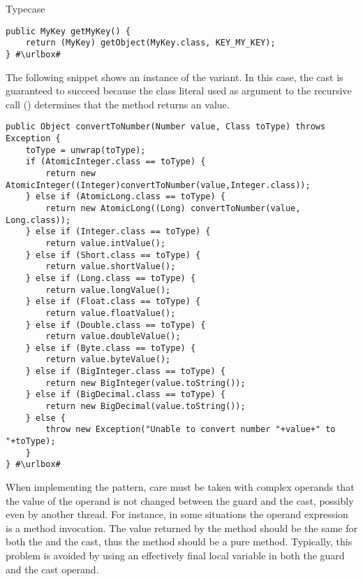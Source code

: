 \begin{pattern}{Typecase}
\def\urlvar{http://bit.ly/smartdevicelink_sdl_android_2EjJiaq}
\begin{verbatim}
public MyKey getMyKey() {
    return (MyKey) getObject(MyKey.class, KEY_MY_KEY);
} #\urlbox#
\end{verbatim}

The following snippet shows an instance of the  variant. 
In this case, the cast is guaranteed to succeed because the class literal used as argument to the recursive call () determines that the method returns an  value.
\def\urlvar{http://bit.ly/apache_karaf_2HE55gE}
\begin{verbatim}
public Object convertToNumber(Number value, Class toType) throws Exception {
    toType = unwrap(toType);
    if (AtomicInteger.class == toType) {
        return new AtomicInteger((Integer)convertToNumber(value,Integer.class));
    } else if (AtomicLong.class == toType) {
        return new AtomicLong((Long) convertToNumber(value, Long.class));
    } else if (Integer.class == toType) {
        return value.intValue();
    } else if (Short.class == toType) {
        return value.shortValue();
    } else if (Long.class == toType) {
        return value.longValue();
    } else if (Float.class == toType) {
        return value.floatValue();
    } else if (Double.class == toType) {
        return value.doubleValue();
    } else if (Byte.class == toType) {
        return value.byteValue();
    } else if (BigInteger.class == toType) {
        return new BigInteger(value.toString());
    } else if (BigDecimal.class == toType) {
        return new BigDecimal(value.toString());
    } else {
        throw new Exception("Unable to convert number "+value+" to "+toType);
    }
} #\urlbox#
\end{verbatim}


\detection{}
When implementing the pattern,
care must be taken with complex operands that the value of the operand is
not changed between the guard and the cast, possibly even by another thread.
For instance, in some situations the operand expression is a method invocation.
The value returned by the method should be the same for both the
 and the cast, thus the method should be a pure method.
Typically, this problem is avoided by using an effectively final local variable in both the guard and the
cast operand.


\end{pattern}
